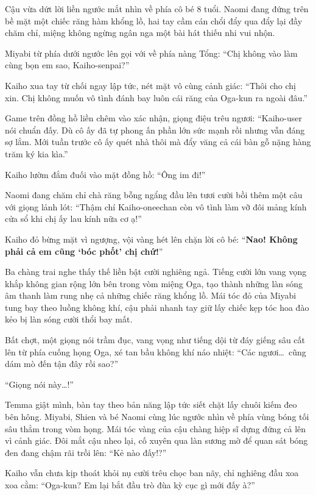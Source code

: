 \documentclass[../main.tex]{subfiles}
\begin{document}
Cậu vừa dứt lời liền ngước mắt nhìn về phía cô bé 8 tuổi. Naomi đang đứng trên bề mặt một chiếc răng hàm khổng lồ, hai tay cầm cán chổi đẩy qua đẩy lại đầy chăm chỉ, miệng không ngừng ngân nga một bài hát thiếu nhi vui nhộn.


Miyabi từ phía dưới ngước lên gọi với về phía nàng Tổng: ``Chị không vào làm cùng bọn em sao, Kaiho-senpai?''

Kaiho xua tay từ chối ngay lập tức, nét mặt vô cùng cảnh giác: ``Thôi cho chị xin. Chị không muốn vô tình đánh bay luôn cái răng của Oga-kun ra ngoài đâu.''

Game trên đồng hồ liền chêm vào xác nhận, giọng điệu trêu ngươi: ``Kaiho-user nói chuẩn đấy. Dù cô ấy đã tự phong ấn phần lớn sức mạnh rồi nhưng vẫn đáng sợ lắm. Mới tuần trước cô ấy quét nhà thôi mà đẩy văng cả cái bàn gỗ nặng hàng trăm ký kia kìa.''

Kaiho lườm đắm đuối vào mặt đồng hồ: ``Ông im đi!''

Naomi đang chăm chỉ chà răng bỗng ngẩng đầu lên tươi cười bồi thêm một câu với giọng lảnh lót: ``Thậm chí Kaiho-oneechan còn vô tình làm vỡ đôi mảng kính cửa sổ khi chị ấy lau kính nữa cơ ạ!''

Kaiho đỏ bừng mặt vì ngượng, vội vàng hét lên chặn lời cô bé: ``\textbf{Nao! Không phải cả em cũng `bóc phốt' chị chứ!}''

Ba chàng trai nghe thấy thế liền bật cười nghiêng ngả. Tiếng cười lớn vang vọng khắp không gian rộng lớn bên trong vòm miệng Oga, tạo thành những làn sóng âm thanh làm rung nhẹ cả những chiếc răng khổng lồ. Mái tóc đỏ của Miyabi tung bay theo luồng không khí, cậu phải nhanh tay giữ lấy chiếc kẹp tóc hoa đào kẻo bị làn sóng cười thổi bay mất.

Bất chợt, một giọng nói trầm đục, vang vọng như tiếng dội từ đáy giếng sâu cất lên từ phía cuống họng Oga, xé tan bầu không khí náo nhiệt: ``Các ngươi\dots\ cũng dám mò đến tận đây rồi sao?''

``Giọng nói này\dots!''

Temma giật mình, bàn tay theo bản năng lập tức siết chặt lấy chuôi kiếm đeo bên hông. Miyabi, Shien và bé Naomi cùng lúc ngước nhìn về phía vùng bóng tối sâu thẳm trong vòm họng. Mái tóc vàng của cậu chàng hiệp sĩ dựng đứng cả lên vì cảnh giác. Đôi mắt cậu nheo lại, cố xuyên qua làn sương mờ để quan sát bóng đen đang chậm rãi trồi lên: ``Kẻ nào đấy!?''

Kaiho vẫn chưa kịp thoát khỏi nụ cười trêu chọc ban nãy, chỉ nghiêng đầu xoa xoa cằm: ``Oga-kun? Em lại bắt đầu trò đùa kỳ cục gì mới đấy à?''
\end{document}
